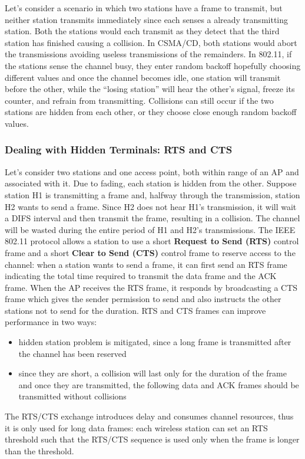 \documentclass{article}
\begin{document}
Let’s consider a scenario in which two stations have a frame to transmit, but neither station transmits immediately since each senses a already transmitting station.
Both the stations would each transmit as they detect that the third station has finished causing a collision.
In CSMA/CD, both stations would abort the transmissions avoiding useless transmissions of the remainders.
In 802.11, if the stations sense the channel busy, they enter random backoff hopefully choosing different values and once the channel becomes idle, one station will transmit before the other, while the “losing station” will hear the other's signal, freeze its counter, and refrain from transmitting.
Collisions can still occur if the two stations are hidden from each other, or they choose close enough random backoff values.
\subsubsection*{Dealing with Hidden Terminals: RTS and CTS}
Let’s consider two stations and one access point, both within range of an AP and associated with it.
Due to fading, each station is hidden from the other.
Suppose station H1 is transmitting a frame and, halfway through the transmission, station H2 wants to send a frame.
Since H2 does not hear H1's transmission, it will wait a DIFS interval and then transmit the frame, resulting in a collision. The channel will be wasted during the entire period of H1 and H2’s transmissions.
The IEEE 802.11 protocol allows a station to use a short \textbf{Request to Send (RTS)} control frame and a short \textbf{Clear to Send (CTS)} control frame to reserve access to the channel: when a station wants to send a frame, it can first send an RTS frame indicating the total time required to transmit the data frame and the ACK frame.
When the AP receives the RTS frame, it responds by broadcasting a CTS frame which gives the sender permission to send and also instructs the other stations not to send for the duration. 
RTS and CTS frames can improve performance in two ways: 
\begin{itemize}
    \item hidden station problem is mitigated, since a long frame is transmitted after the channel has been reserved
    \item since they are short, a collision will last only for the duration of the frame and once they are transmitted, the following data and ACK frames should be transmitted without collisions
\end{itemize}
The RTS/CTS exchange introduces delay and consumes channel resources, thus it is only used for long data frames: each wireless station can set an RTS threshold such that the RTS/CTS sequence is used only when the frame is longer than the threshold.
\end{document}

